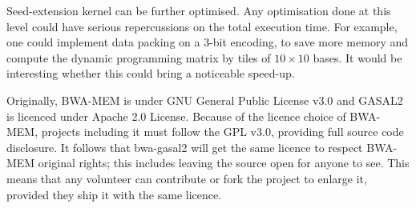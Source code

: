 

Seed-extension kernel can be further optimised. Any optimisation done at this level could have serious repercussions on the total execution time. For example, one could implement data packing on a 3-bit encoding, to save more memory and compute the dynamic programming matrix by tiles of $10 \times 10$ bases. It would be interesting whether this could bring a noticeable speed-up.

Originally, BWA-MEM is under GNU General Public License v3.0 and GASAL2 is licenced under Apache 2.0 License. Because of the licence choice of BWA-MEM, projects including it must follow the GPL v3.0, providing full source code disclosure. It follows that bwa-gasal2 will get the same licence to respect BWA-MEM original rights; this includes leaving the source open for anyone to see. This means that any volunteer can contribute or fork the project to enlarge it, provided they ship it with the same licence.